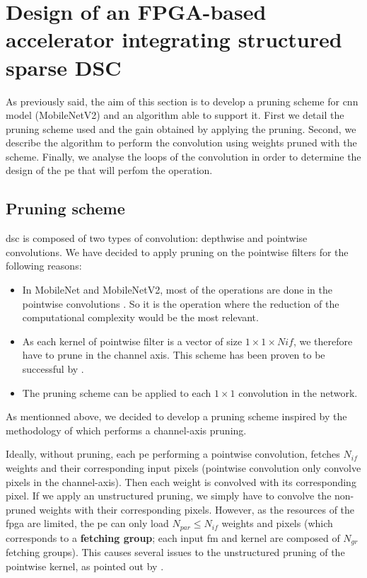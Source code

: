 \section{Design of an FPGA-based accelerator integrating structured sparse DSC} \label{sec:design}
As previously said,  the aim of this section is to develop a pruning scheme for \acrshort{cnn} model (MobileNetV2) and an algorithm able to support it. First we detail the pruning scheme used and the gain obtained by applying the pruning. Second, we describe the algorithm to perform the convolution using weights pruned with the scheme. Finally, we analyse the loops of the convolution in order to determine the design of the \acrshort{pe} that will perfom the operation.
%
\subsection{Pruning scheme} \label{subsec:pscheme}
%
\acrshort{dsc} is composed of two types of convolution: depthwise and pointwise convolutions. We have decided to apply pruning on the pointwise filters for the following reasons:
%
\begin{itemize}
    \item In MobileNet and MobileNetV2, most of the operations are done in the pointwise convolutions \cite{zhang_channel_2019, tu_pruning_2019}. So it is the operation where the reduction of the computational complexity would be the most relevant.
    \item As each kernel of pointwise filter is a vector of size $1 \times 1  \times Nif$, we therefore have to prune in the channel axis. This scheme has been proven to be successful by \textcite{kang_accelerator-aware_2020}.
    \item The pruning scheme can be applied to each $1 \times 1$ convolution in the network.
\end{itemize}
%
As mentionned above, we decided to develop a pruning scheme inspired by the methodology of \textcite{kang_accelerator-aware_2020} which performs a channel-axis pruning.

Ideally, without pruning, each \acrshort{pe} performing a pointwise convolution, fetches $N_{if}$ weights and their corresponding input pixels (pointwise convolution only convolve pixels in the channel-axis). Then each weight is convolved with its corresponding pixel. If we apply an unstructured pruning, we simply have to convolve the non-pruned weights with their corresponding pixels. However, as the resources of the \acrshort{fpga} are limited, the \acrshort{pe} can only load $N_{par} \leq N_{if}$ weights and pixels (which corresponds to a \textbf{fetching group}; each input \acrshort{fm} and kernel are composed of $N_{gr}$ fetching groups). This causes several issues to the unstructured pruning of the pointwise kernel, as pointed out by \cite{kang_accelerator-aware_2020}.

